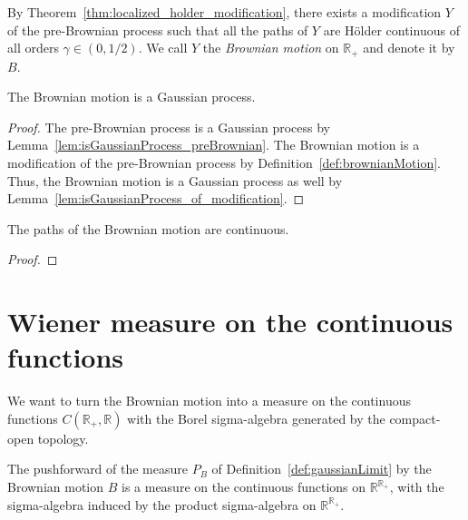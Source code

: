 \begin{definition}\label{def:brownianMotion}
  \notready
By Theorem~\ref{thm:localized_holder_modification}, there exists a modification $Y$ of the pre-Brownian process such that all the paths of $Y$ are Hölder continuous of all orders $\gamma \in (0, 1/2)$.
We call $Y$ the \emph{Brownian motion} on $\mathbb{R}_+$ and denote it by $B$.
\end{definition}


\begin{lemma}\label{lem:isGaussianProcess_brownianMotion}
  The Brownian motion is a Gaussian process.
\end{lemma}

\begin{proof}
The pre-Brownian process is a Gaussian process by Lemma~\ref{lem:isGaussianProcess_preBrownian}.
The Brownian motion is a modification of the pre-Brownian process by Definition~\ref{def:brownianMotion}.
Thus, the Brownian motion is a Gaussian process as well by Lemma~\ref{lem:isGaussianProcess_of_modification}.
\end{proof}


\begin{lemma}\label{lem:continuous_brownianMotion}
  \leanok
The paths of the Brownian motion are continuous.
\end{lemma}

\begin{proof}

\end{proof}


\section{Wiener measure on the continuous functions}

We want to turn the Brownian motion into a measure on the continuous functions $C(\mathbb{R}_+, \mathbb{R})$ with the Borel sigma-algebra generated by the compact-open topology.


\begin{definition}\label{def:wienerMeasureAux}
  \leanok
The pushforward of the measure $P_B$ of Definition~\ref{def:gaussianLimit} by the Brownian motion $B$ is a measure on the continuous functions on $\mathbb{R}^{\mathbb{R}_+}$, with the sigma-algebra induced by the product sigma-algebra on $\mathbb{R}^{\mathbb{R}_+}$.
\end{definition}


